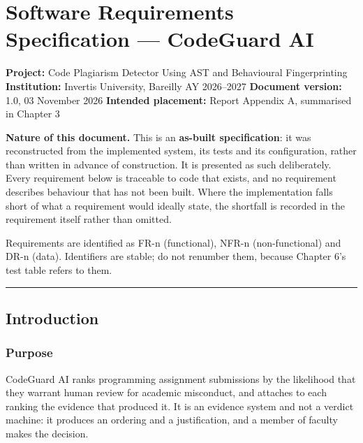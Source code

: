 \hypertarget{software-requirements-specification-codeguard-ai}{%
\chapter{Software Requirements Specification --- CodeGuard
AI}\label{software-requirements-specification-codeguard-ai}}

\textbf{Project:} Code Plagiarism Detector Using AST and Behavioural
Fingerprinting \textbf{Institution:} Invertis University, Bareilly \textperiodcentered{} AY
2026--2027 \textbf{Document version:} 1.0, 03 November 2026
\textbf{Intended placement:} Report Appendix A, summarised in Chapter 3

\begin{draftnote}

\textbf{Nature of this document.} This is an \textbf{as-built
specification}: it was reconstructed from the implemented system, its
tests and its configuration, rather than written in advance of
construction. It is presented as such deliberately. Every requirement
below is traceable to code that exists, and no requirement describes
behaviour that has not been built. Where the implementation falls short
of what a requirement would ideally state, the shortfall is recorded in
the requirement itself rather than omitted.

Requirements are identified as FR-n (functional), NFR-n (non-functional)
and DR-n (data). Identifiers are stable; do not renumber them, because
Chapter 6's test table refers to them.

\end{draftnote}

\begin{center}\rule{0.5\linewidth}{0.5pt}\end{center}

\hypertarget{introduction}{%
\section{Introduction}\label{introduction}}

\hypertarget{purpose}{%
\subsection{Purpose}\label{purpose}}

CodeGuard AI ranks programming assignment submissions by the likelihood
that they warrant human review for academic misconduct, and attaches to
each ranking the evidence that produced it. It is an evidence system and
not a verdict machine: it produces an ordering and a justification, and
a member of faculty makes the decision.

